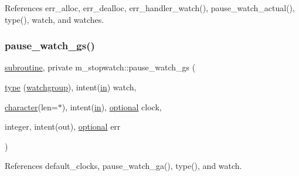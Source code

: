 References err\+\_\+alloc, err\+\_\+dealloc, err\+\_\+handler\+\_\+watch(), pause\+\_\+watch\+\_\+actual(), type(), watch, and watches.

\mbox{\label{namespacem__stopwatch_a25c025ae33c702473780e6d53dd5e054}} 
\subsubsection{\texorpdfstring{pause\+\_\+watch\+\_\+gs()}{pause\_watch\_gs()}}
{\footnotesize\ttfamily \hyperlink{M__stopwatch_83_8txt_acfbcff50169d691ff02d4a123ed70482}{subroutine}, private m\+\_\+stopwatch\+::pause\+\_\+watch\+\_\+gs (\begin{DoxyParamCaption}\item[{\hyperlink{stop__watch_83_8txt_a70f0ead91c32e25323c03265aa302c1c}{type} (\hyperlink{structm__stopwatch_1_1watchgroup}{watchgroup}), intent(\hyperlink{M__journal_83_8txt_afce72651d1eed785a2132bee863b2f38}{in})}]{watch,  }\item[{\hyperlink{option__stopwatch_83_8txt_abd4b21fbbd175834027b5224bfe97e66}{character}(len=$\ast$), intent(\hyperlink{M__journal_83_8txt_afce72651d1eed785a2132bee863b2f38}{in}), \hyperlink{option__stopwatch_83_8txt_aa4ece75e7acf58a4843f70fe18c3ade5}{optional}}]{clock,  }\item[{integer, intent(out), \hyperlink{option__stopwatch_83_8txt_aa4ece75e7acf58a4843f70fe18c3ade5}{optional}}]{err }\end{DoxyParamCaption})\hspace{0.3cm}{\ttfamily [private]}}



References default\+\_\+clocks, pause\+\_\+watch\+\_\+ga(), type(), and watch.

\mbox{\label{namespacem__stopwatch_a5101b247e586498a826e1a7819bf13d5}} 
